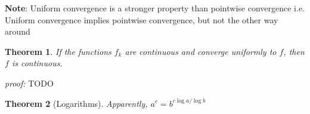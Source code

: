 \documentclass[12pt, a4paper]{article}
\newtheorem{theorem}{Theorem}[subsection]
\begin{document}
\textbf{Note}: Uniform convergence is a stronger property than pointwise convergence i.e. Uniform convergence implies pointwise convergence, but not the other way around

\begin{theorem}
    If the functions $f_k$ are continuous and converge uniformly to $f$, then $f$ is continuous. 
\end{theorem}

\textit{proof:} TODO


\begin{theorem}[Logarithms]
    Apparently, $a^c = b^{c\log a / \log b}$
\end{theorem}
\end{document}
